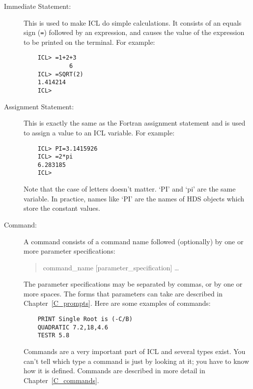 \begin{description}

\item [Immediate Statement:] \mbox{}

 This is used to make ICL do simple calculations.
 It consists of an equals sign (\verb+=+) followed by an expression, and causes
 the value of the expression to be printed on the terminal.
 For example:

\begin{small}
\begin{verbatim}
    ICL> =1+2+3
             6
    ICL> =SQRT(2)
    1.414214
    ICL>
\end{verbatim}
\end{small}


\item [Assignment Statement:] \mbox{}

 This is exactly the same as the Fortran assignment statement and is used to
 assign a value to an ICL variable.
 For example:

\begin{small}
\begin{verbatim}
    ICL> PI=3.1415926
    ICL> =2*pi
    6.283185
    ICL>
\end{verbatim}
\end{small}

 Note that the case of letters doesn't matter.
 `PI' and `pi' are the same variable.
 In practice, names like `PI' are the names of HDS objects which store the
 constant values.

\item [Command:] \mbox{}

A command consists of a command name followed (optionally) by one or more
parameter specifications:
\begin{quote}
    command\_name [parameter\_specification] \ldots
\end{quote}
The parameter specifications may be separated by commas, or by one or more
spaces.
The forms that parameters can take are described in Chapter~\ref{C_prompts}.
Here are some examples of commands:

\begin{small}
\begin{verbatim}
    PRINT Single Root is (-C/B)
    QUADRATIC 7.2,18,4.6
    TESTR 5.8
\end{verbatim}
\end{small}

Commands are a very important part of ICL and several types exist.
You can't tell which type a command is just by looking at it; you have to
know how it is defined.
Commands are described in more detail in Chapter~\ref{C_commands}.
\end{description}


